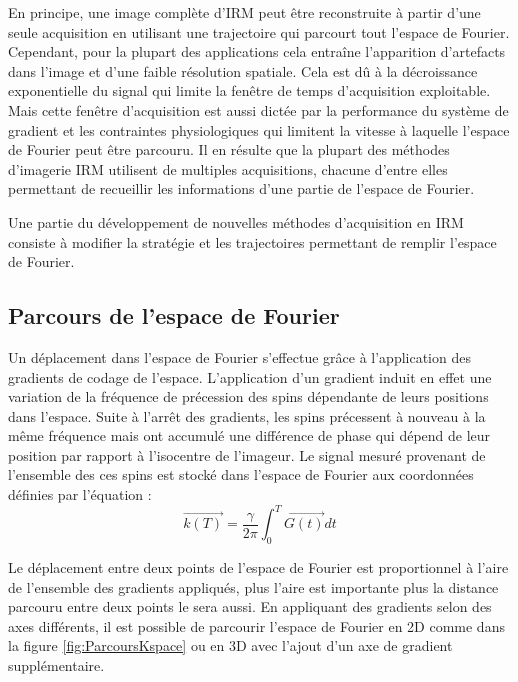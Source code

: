 En principe, une image complète d'IRM peut être reconstruite à partir d'une seule acquisition en utilisant une trajectoire qui  parcourt tout l'espace de Fourier. Cependant, pour la plupart des applications cela entraîne l'apparition d'artefacts dans l'image et d'une faible résolution spatiale. Cela est dû à la décroissance exponentielle du signal qui limite la fenêtre de temps d'acquisition exploitable. Mais cette fenêtre d'acquisition est aussi dictée par la performance du système de gradient et les contraintes physiologiques qui limitent la vitesse à laquelle l'espace de Fourier peut être parcouru. Il en résulte que la plupart des méthodes d'imagerie IRM utilisent de multiples acquisitions, chacune d'entre elles permettant de recueillir les informations d'une partie de l'espace de Fourier.

Une partie du développement de nouvelles méthodes d'acquisition en IRM consiste à modifier la stratégie et les trajectoires permettant de remplir l'espace de Fourier.


\subsection{Parcours de l'espace de Fourier}
\label{subsec:Parcours}

Un déplacement dans l'espace de Fourier s'effectue grâce à l'application des gradients de codage de l'espace. L'application d'un gradient induit en effet une variation de la fréquence de précession des spins dépendante de leurs positions dans l'espace. Suite à l'arrêt des gradients, les spins précessent à nouveau à la même fréquence mais ont accumulé une différence de phase qui dépend de leur position par rapport à l'isocentre de l'imageur. Le signal mesuré provenant de l'ensemble des ces spins est stocké dans l'espace de Fourier aux coordonnées définies par l'équation :
\begin{equation}
\overrightarrow{k(T)}= \frac{\gamma}{2\pi} \int_0^T \overrightarrow{G(t)}dt
\end{equation}

Le déplacement entre deux points de l'espace de Fourier est proportionnel à l'aire de l'ensemble des gradients appliqués, plus l'aire est importante plus la distance parcouru entre deux points le sera aussi. En appliquant des gradients selon des axes différents, il est possible de parcourir l'espace de Fourier en 2D comme dans la figure \ref{fig:ParcoursKspace} ou en 3D avec l'ajout d'un axe de gradient supplémentaire.

